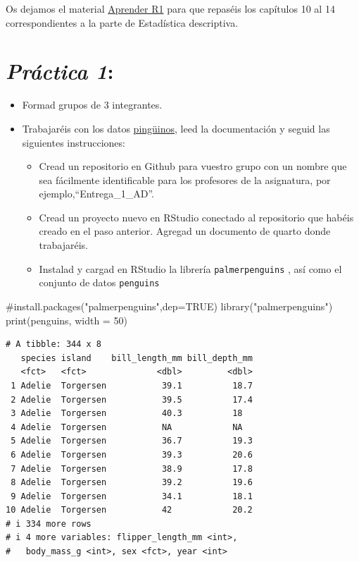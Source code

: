 \documentclass[
  letterpaper,
  DIV=11,
  numbers=noendperiod]{scrreprt}
\newenvironment{Shaded}{\begin{snugshade}}{\end{snugshade}}
\newcommand{\AttributeTok}[1]{\textcolor[rgb]{0.40,0.45,0.13}{#1}}
\newcommand{\CommentTok}[1]{\textcolor[rgb]{0.37,0.37,0.37}{#1}}
\newcommand{\DecValTok}[1]{\textcolor[rgb]{0.68,0.00,0.00}{#1}}
\newcommand{\FunctionTok}[1]{\textcolor[rgb]{0.28,0.35,0.67}{#1}}
\newcommand{\NormalTok}[1]{\textcolor[rgb]{0.00,0.23,0.31}{#1}}
\newcommand{\StringTok}[1]{\textcolor[rgb]{0.13,0.47,0.30}{#1}}
\begin{document}
Os dejamos el material
\href{https://aprender-uib.github.io/AprendeR1/}{Aprender R1} para que
repaséis los capítulos 10 al 14 correspondientes a la parte de
Estadística descriptiva.

\section{\texorpdfstring{{\emph{Práctica
1}}:}{Práctica 1:}}\label{pruxe1ctica-1}

\begin{itemize}
\item
  Formad grupos de 3 integrantes.
\item
  Trabajaréis con los datos
  \href{https://allisonhorst.github.io/palmerpenguins/}{pingüinos}, leed
  la documentación y seguid las siguientes instrucciones:

  \begin{itemize}
  \item
    Cread un repositorio en Github para vuestro grupo con un nombre que
    sea fácilmente identificable para los profesores de la asignatura,
    por ejemplo,``Entrega\_1\_AD''.
  \item
    Cread un proyecto nuevo en RStudio conectado al repositorio que
    habéis creado en el paso anterior. Agregad un documento de quarto
    donde trabajaréis.
  \item
    Instalad y cargad en RStudio la librería \texttt{palmerpenguins} ,
    así como el conjunto de datos \texttt{penguins}
  \end{itemize}
\end{itemize}

\begin{Shaded}
\begin{Highlighting}[]
\CommentTok{\#install.packages("palmerpenguins",dep=TRUE)}
\FunctionTok{library}\NormalTok{(}\StringTok{"palmerpenguins"}\NormalTok{)}
\FunctionTok{print}\NormalTok{(penguins, }\AttributeTok{width =} \DecValTok{50}\NormalTok{)}
\end{Highlighting}
\end{Shaded}

\begin{verbatim}
# A tibble: 344 x 8
   species island    bill_length_mm bill_depth_mm
   <fct>   <fct>              <dbl>         <dbl>
 1 Adelie  Torgersen           39.1          18.7
 2 Adelie  Torgersen           39.5          17.4
 3 Adelie  Torgersen           40.3          18  
 4 Adelie  Torgersen           NA            NA  
 5 Adelie  Torgersen           36.7          19.3
 6 Adelie  Torgersen           39.3          20.6
 7 Adelie  Torgersen           38.9          17.8
 8 Adelie  Torgersen           39.2          19.6
 9 Adelie  Torgersen           34.1          18.1
10 Adelie  Torgersen           42            20.2
# i 334 more rows
# i 4 more variables: flipper_length_mm <int>,
#   body_mass_g <int>, sex <fct>, year <int>
\end{verbatim}
\end{document}
